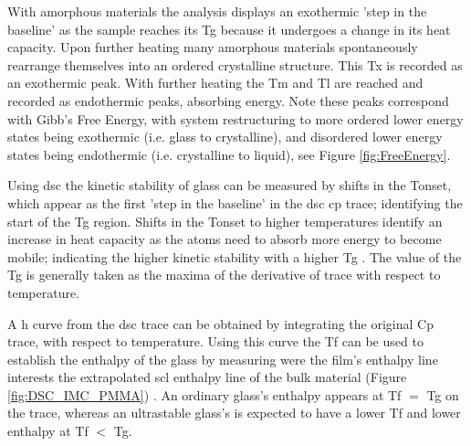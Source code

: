 \documentclass[a4paper,12pt,oneside]{report}%
\begin{document}
With amorphous materials the analysis displays an exothermic 'step in the baseline' as the sample reaches its \gls{Tg} because it undergoes a change in its heat capacity. Upon further heating many amorphous materials spontaneously rearrange themselves into an ordered crystalline structure. This \gls{Tx}  is recorded as an exothermic peak. With further heating the \gls{Tm} and \gls{Tl} are reached and recorded as endothermic peaks,  absorbing energy. Note these peaks correspond with Gibb's Free Energy,  with system restructuring to more ordered lower energy states being exothermic (i.e. glass to crystalline), and disordered lower energy states being endothermic (i.e. crystalline to liquid), see Figure \ref{fig:FreeEnergy}.

Using \gls{dsc} the kinetic stability of glass can be measured by shifts in the \gls{Tonset}, which appear as the first 'step in the baseline' in the \gls{dsc} \gls{cp} trace; identifying the start of the \gls{Tg} region. Shifts in the \gls{Tonset} to higher temperatures identify an increase in heat capacity as the atoms need to absorb more energy to become mobile; indicating the higher kinetic stability with a higher \gls{Tg} \cite{Kearns2008}. The value of the \gls{Tg} is generally taken as the maxima of the derivative of trace with respect to temperature.

A \acrfull{h} curve from the \gls{dsc} trace can be obtained by integrating the original \gls{Cp} trace, with respect to temperature. Using this curve the \gls{Tf}  can be used to establish the enthalpy of the glass  by measuring were the film's enthalpy line interests the extrapolated \gls{scl} enthalpy line of the bulk material (Figure \ref{fig:DSC_IMC_PMMA}) \cite{Kearns2008}. An ordinary glass's enthalpy appears at \gls{Tf} $=$ \gls{Tg} on the trace, whereas an ultrastable glass's is expected to have a lower \gls{Tf} and lower enthalpy at \gls{Tf} $<$ \gls{Tg}. 
\end{document}
